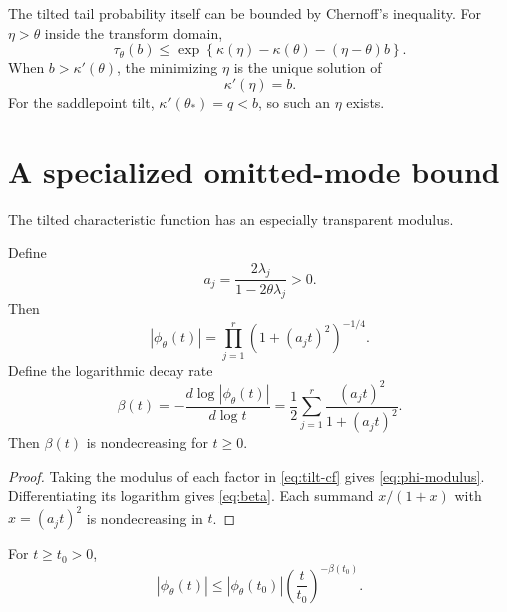 The tilted tail probability itself can be bounded by Chernoff's inequality. For $\eta>\theta$ inside the transform domain,
\begin{equation}
\tau_{\theta}(b)
\le
\exp\left\{
\kappa(\eta)-\kappa(\theta)-(\eta-\theta)b
\right\}.
\label{eq:tilted-chernoff}
\end{equation}
When $b>\kappa'(\theta)$, the minimizing $\eta$ is the unique solution of
\begin{equation}
\kappa'(\eta)=b.
\label{eq:eta}
\end{equation}
For the saddlepoint tilt, $\kappa'(\theta_*)=q<b$, so such an $\eta$ exists.

\section{A specialized omitted-mode bound}

The tilted characteristic function has an especially transparent modulus.

\begin{lemma}
\label{lem:modulus}
Define
\begin{equation}
a_j=\frac{2\lambda_j}{1-2\theta\lambda_j}>0.
\label{eq:aj}
\end{equation}
Then
\begin{equation}
|\phi_{\theta}(t)|
=\prod_{j=1}^{r}\left(1+(a_jt)^2\right)^{-1/4}.
\label{eq:phi-modulus}
\end{equation}
Define the logarithmic decay rate
\begin{equation}
\beta(t)
=-\frac{d\log|\phi_{\theta}(t)|}{d\log t}
=\frac12\sum_{j=1}^{r}
\frac{(a_jt)^2}{1+(a_jt)^2}.
\label{eq:beta}
\end{equation}
Then $\beta(t)$ is nondecreasing for $t\ge0$.
\end{lemma}

\begin{proof}
Taking the modulus of each factor in \eqref{eq:tilt-cf} gives \eqref{eq:phi-modulus}. Differentiating its logarithm gives \eqref{eq:beta}. Each summand $x/(1+x)$ with $x=(a_jt)^2$ is nondecreasing in $t$.
\end{proof}

\begin{corollary}
\label{cor:power-envelope}
For $t\ge t_0>0$,
\begin{equation}
|\phi_{\theta}(t)|
\le
|\phi_{\theta}(t_0)|
\left(\frac{t}{t_0}\right)^{-\beta(t_0)}.
\label{eq:power-envelope}
\end{equation}
\end{corollary}

